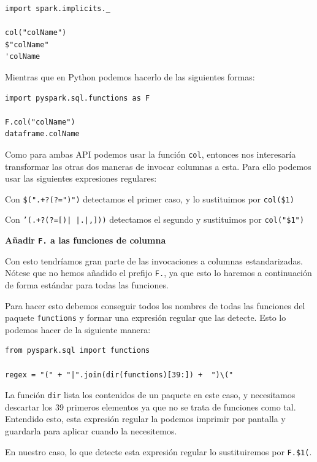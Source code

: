 \documentclass[12pt,twoside,titlepage]{report}
\begin{document}
\begin{lstlisting}
import spark.implicits._
	
col("colName")
$"colName"
'colName
\end{lstlisting}

Mientras que en Python podemos hacerlo de las siguientes formas:

\begin{lstlisting}
import pyspark.sql.functions as F

F.col("colName")
dataframe.colName
\end{lstlisting}

Como para ambas API podemos usar la función \texttt{col}, entonces nos interesaría transformar las otras dos maneras de invocar columnas a esta. Para ello podemos usar las siguientes expresiones regulares:
\begin{compactitem}
	\item Con \texttt{\$(".+?(?=")")} detectamos el primer caso, y lo sustituimos por \texttt{col(\$1)}
	\item Con \texttt{'(.+?(?=[)| |.|,]))} detectamos el segundo y sustituimos por \texttt{col("\$1")}
\end{compactitem}


\textbf{Añadir \texttt{F.} a las funciones de columna}

Con esto tendríamos gran parte de las invocaciones a columnas estandarizadas. Nótese que no hemos añadido el prefijo \texttt{F.}, ya que esto lo haremos a continuación de forma estándar para todas las funciones.

Para hacer esto debemos conseguir todos los nombres de todas las funciones del paquete \texttt{functions} y formar una expresión regular que las detecte. Esto lo podemos hacer de la siguiente manera:

\begin{lstlisting}
from pyspark.sql import functions

regex = "(" + "|".join(dir(functions)[39:]) +  ")\("
\end{lstlisting}

La función \texttt{dir} lista los contenidos de un paquete en este caso, y necesitamos descartar los 39 primeros elementos ya que no se trata de funciones como tal. Entendido esto, esta expresión regular la podemos imprimir por pantalla y guardarla para aplicar cuando la necesitemos.

En nuestro caso, lo que detecte esta expresión regular lo sustituiremos por \texttt{F.\$1(}.
\end{document}
